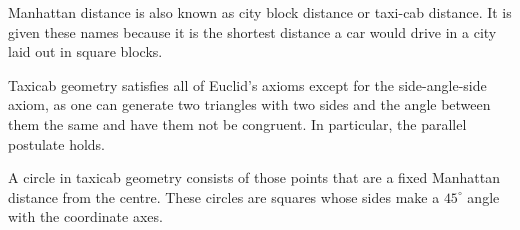 Manhattan distance is also known as city block distance or taxi-cab distance. It is given these names because it is the shortest distance a car would drive in a city laid out in square blocks. 

Taxicab geometry satisfies all of Euclid's axioms except for the side-angle-side axiom, as one can generate two triangles with two sides and the angle between them the same and have them not be congruent. In particular, the parallel postulate holds.

A circle in taxicab geometry consists of those points that are a fixed Manhattan distance from the centre. These circles are squares whose sides make a $45^\circ$ angle with the coordinate axes.

% 
% 
% 
% 
